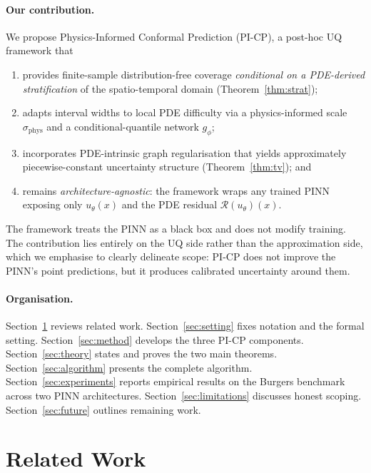 \documentclass[11pt]{article}
\theoremstyle{definition}
\theoremstyle{remark}
\newcommand{\sphys}{\sigma_{\mathrm{phys}}}
\newcommand{\Rop}{\mathcal{R}}
\begin{document}
\paragraph{Our contribution.} We propose Physics-Informed Conformal Prediction (PI-CP), a post-hoc UQ framework that
\begin{enumerate}[leftmargin=*,topsep=2pt,itemsep=2pt]
    \item provides finite-sample distribution-free coverage \emph{conditional on a PDE-derived stratification} of the spatio-temporal domain (Theorem~\ref{thm:strat});
    \item adapts interval widths to local PDE difficulty via a physics-informed scale $\sphys$ and a conditional-quantile network $g_\phi$;
    \item incorporates PDE-intrinsic graph regularisation that yields approximately piecewise-constant uncertainty structure (Theorem~\ref{thm:tv}); and
    \item remains \emph{architecture-agnostic}: the framework wraps any trained PINN exposing only $u_\theta(x)$ and the PDE residual $\Rop(u_\theta)(x)$.
\end{enumerate}

The framework treats the PINN as a black box and does not modify training. The contribution lies entirely on the UQ side rather than the approximation side, which we emphasise to clearly delineate scope: PI-CP does not improve the PINN's point predictions, but it produces calibrated uncertainty around them.

\paragraph{Organisation.} Section~\ref{sec:rw} reviews related work. Section~\ref{sec:setting} fixes notation and the formal setting. Section~\ref{sec:method} develops the three PI-CP components. Section~\ref{sec:theory} states and proves the two main theorems. Section~\ref{sec:algorithm} presents the complete algorithm. Section~\ref{sec:experiments} reports empirical results on the Burgers benchmark across two PINN architectures. Section~\ref{sec:limitations} discusses honest scoping. Section~\ref{sec:future} outlines remaining work.

\section{Related Work}
\label{sec:rw}
\end{document}
